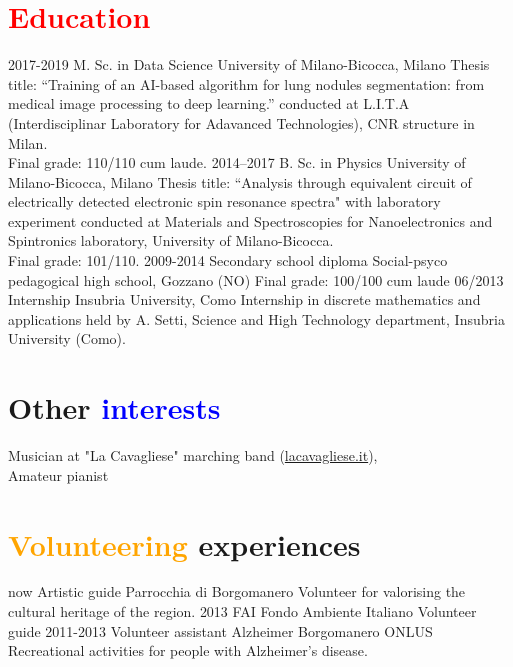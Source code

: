 \documentclass[a4paper]{friggeri-cv}
\begin{document}
\section{\textcolor{red}{Education}}

\begin{entrylist}
  \entry
    {2017-2019}
    {M. Sc. in Data Science}
    {University of Milano-Bicocca, Milano}
    {Thesis title: ``Training of an AI-based algorithm for lung nodules segmentation: from medical image processing to deep learning.'' conducted at L.I.T.A (Interdisciplinar Laboratory for Adavanced Technologies), CNR structure in Milan.\\
    Final grade: 110/110 cum laude.}
  \entry
    {2014–2017}
    {B. Sc. in Physics}
    {University of Milano-Bicocca, Milano}
    {Thesis title: ``Analysis through equivalent circuit of electrically detected electronic spin resonance spectra" with laboratory experiment conducted at Materials and Spectroscopies for Nanoelectronics and Spintronics laboratory, University of Milano-Bicocca.\\
    Final grade: 101/110. }
  \entry
    {2009-2014}
    {Secondary school diploma}
    {Social-psyco pedagogical high school, Gozzano (NO)}
    {Final grade: 100/100 cum laude}
  \entry
    {06/2013}
    {Internship}
    {Insubria University, Como}
    {Internship in discrete mathematics and applications held by A. Setti, Science and High Technology department, Insubria University (Como).}
\end{entrylist}

\section{Other \textcolor{blue}{interests}}
Musician at "La Cavagliese" marching band (\href{http://www.lacavagliese.it/}{lacavagliese.it}),\\
Amateur pianist
\section{\textcolor{orange}{Volunteering} experiences}
\begin{entrylist}
	\entry
	{now}
	{Artistic guide}
	{Parrocchia di Borgomanero}
	{Volunteer for valorising the cultural heritage of the region.}
	\entry
	{2013}
	{FAI}
	{Fondo Ambiente Italiano}
	{Volunteer guide}
	\entry
	{2011-2013}
	{Volunteer assistant}
	{Alzheimer Borgomanero ONLUS}
	{Recreational activities for people with Alzheimer's disease.}
\end{entrylist}
\end{document}
